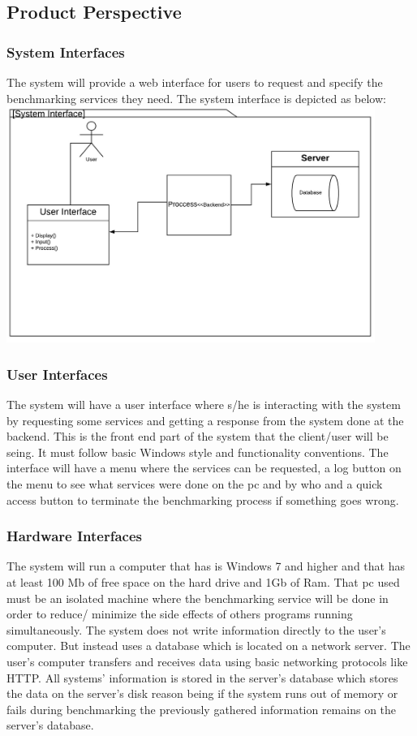 \documentclass[a4paper,12pt]{article}
\begin{document}
\subsection{Product Perspective}

\subsubsection{System Interfaces}
The system will provide a web interface for users to request and specify the benchmarking services they need. The system interface is depicted as below:\\
\includegraphics[width=12cm]{SI.jpeg}
\subsubsection{User Interfaces}
The system will have a user interface where s/he is interacting with the system by requesting some services and getting a response from the system done at the backend. This is the front end part of the system that the client/user will be seing. It must follow basic Windows style and functionality conventions. The interface will have a menu where the services can be requested, a log button on the menu to see what services were done on the pc and by who and a quick access button to terminate the benchmarking process if something goes wrong.
\subsubsection{Hardware Interfaces}
The system will run a computer that has is Windows 7 and higher and that has at least 100 Mb of free space on the hard drive and 1Gb of Ram. That pc used must be an isolated machine where the benchmarking service will be done in order to reduce/ minimize the side effects of others programs running simultaneously. The system does not write information directly to the user's computer. But instead uses a database which is located on a network server. The user's computer transfers and receives data using basic networking protocols like HTTP. All systems' information is stored in the server's database which stores the data on the server's disk reason being if the system runs out of memory or fails during benchmarking the previously gathered information remains on the server's database.
\end{document}

